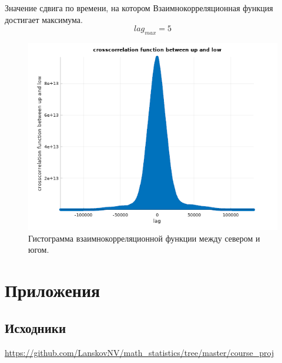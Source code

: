 \documentclass[12pt]{article}
\begin{document}
Значение сдвига по времени, на котором Взаимнокорреляционная функция \cite{wiki} достигает максимума.
$$ lag_{max} = 5 $$

\begin{figure}[H]
\caption{Гистограмма взаимнокорреляционной функции между севером и югом.}
\includegraphics[scale = 1]{plot5.png} 
\end{figure}

\section{Приложения}

\subsection{Исходники} 
\url{https://github.com/LanskovNV/math_statistics/tree/master/course_proj}

\newpage
\end{document}
